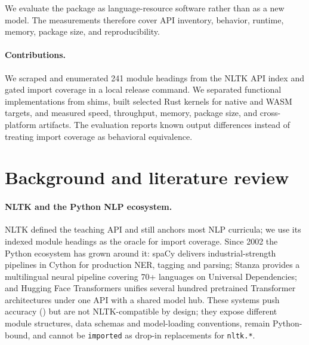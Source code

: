 \documentclass[pdflatex,sn-mathphys-num]{sn-jnl}
\theoremstyle{thmstyleone}
\begin{document}
We evaluate the package as language-resource software rather than as a new model. The measurements therefore cover API inventory, behavior, runtime, memory, package size, and reproducibility.

\paragraph{Contributions.}
We scraped and enumerated 241 module headings from the NLTK API index and gated import coverage in a local release command. We separated functional implementations from shims, built selected Rust kernels for native and WASM targets, and measured speed, throughput, memory, package size, and cross-platform artifacts. The evaluation reports known output differences instead of treating import coverage as behavioral equivalence.

\section{Background and literature review}\label{sec:related}

\paragraph{NLTK and the Python NLP ecosystem.}
NLTK \cite{bird2009nltk,loper2002nltk} defined the teaching API and still anchors most NLP curricula; we use its indexed module headings \cite{nltk2024} as the oracle for import coverage. Since 2002 the Python ecosystem has grown around it: spaCy \cite{spacy2023} delivers industrial-strength pipelines in Cython for production NER, tagging and parsing; Stanza \cite{stanza2020} provides a multilingual neural pipeline covering 70+ languages on Universal Dependencies; and Hugging Face Transformers \cite{wolf2020transformers} unifies several hundred pretrained Transformer architectures under one API with a shared model hub. These systems push accuracy (\cite{spacy2023,stanza2020,wolf2020transformers}) but are not NLTK-compatible by design; they expose different module structures, data schemas and model-loading conventions, remain Python-bound, and cannot be \texttt{imported} as drop-in replacements for \texttt{nltk.*}.
\end{document}
